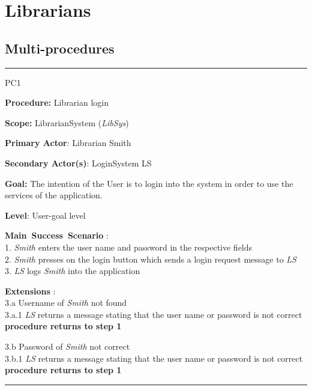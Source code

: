 \section{Librarians}
\label{chap:usage_guide}

\subsection{Multi-procedures}

\vspace{0.5cm}
\hrule
\begin{lyxlist}{PC1}
\small{
\item [\textbf{Procedure:}] Librarian login
\item [\textbf{Scope:}] LibrarianSystem (\emph{LibSys})
\item [\textbf{Primary Actor}:] Librarian Smith
\item [\textbf{Secondary Actor(s)}:] LoginSystem LS
\item [\textbf{Goal:}] The intention of the User is to login into the
system in order to use the services of the application.
\item [\textbf{Level}:] User-goal level
\item [\textbf{Main~Success~Scenario}]:\\
1. \emph{Smith} enters the user name and password in the respective fields\\
2. \emph{Smith} presses on the login button which sends a login request message
to \emph{LS}\\
3. \emph{LS} logs \emph{Smith} into the application\\


\item [\textbf{Extensions}]:\\
3.a Username of \emph{Smith} not found\\
\hspace*{0.5cm} 3.a.1 \emph{LS} returns a message stating that the user name
or password is not correct \\
\hspace*{0.5cm} \textbf{procedure returns to step 1}

3.b Password of \emph{Smith} not correct \\
\hspace*{0.5cm} 3.b.1 \emph{LS} returns a message stating that the user name
or password is not correct \\
\hspace*{0.5cm} \textbf{procedure returns to step 1}

}

\end{lyxlist}
\hrule


